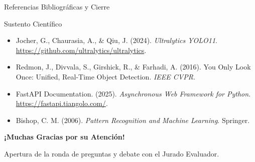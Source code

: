 \documentclass[10pt,aspectratio=169]{beamer}
\begin{document}
\begin{frame}{Referencias Bibliográficas y Cierre}
  \begin{block}{Sustento Científico}
    \scriptsize
    \begin{itemize}
      \item Jocher, G., Chaurasia, A., \& Qiu, J. (2024). \textit{Ultralytics YOLO11}. \url{https://github.com/ultralytics/ultralytics}.
      \item Redmon, J., Divvala, S., Girshick, R., \& Farhadi, A. (2016). You Only Look Once: Unified, Real-Time Object Detection. \textit{IEEE CVPR}.
      \item FastAPI Documentation. (2025). \textit{Asynchronous Web Framework for Python}. \url{https://fastapi.tiangolo.com/}.
      \item Bishop, C. M. (2006). \textit{Pattern Recognition and Machine Learning}. Springer.
    \end{itemize}
  \end{block}
  
  \vspace{0.4cm}
  \centering
  {\large \bfseries \color{unapblue} ¡Muchas Gracias por su Atención!}
  
  \vspace{0.2cm}
  \small \color{darkgray}
  Apertura de la ronda de preguntas y debate con el Jurado Evaluador.
\end{frame}
\end{document}
